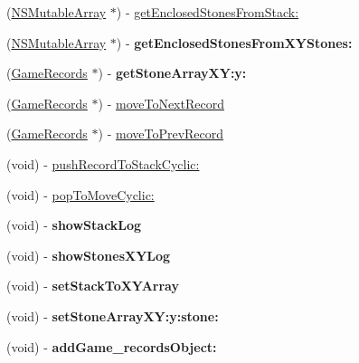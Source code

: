 \begin{DoxyCompactItemize}
\item 
(\hyperlink{class_n_s_mutable_array}{NSMutableArray} $\ast$) -\/ \hyperlink{interface_games_a3c209384d054a75c0e08a5e1107ead3f}{getEnclosedStonesFromStack:}
\item 
\hypertarget{interface_games_a6fada6f7a5e589c859d987ebfe7ef69c}{
(\hyperlink{class_n_s_mutable_array}{NSMutableArray} $\ast$) -\/ {\bfseries getEnclosedStonesFromXYStones:}}
\label{interface_games_a6fada6f7a5e589c859d987ebfe7ef69c}

\item 
\hypertarget{interface_games_aec8599f725ed45a79fea1a19a919f5dd}{
(\hyperlink{interface_game_records}{GameRecords} $\ast$) -\/ {\bfseries getStoneArrayXY:y:}}
\label{interface_games_aec8599f725ed45a79fea1a19a919f5dd}

\item 
(\hyperlink{interface_game_records}{GameRecords} $\ast$) -\/ \hyperlink{interface_games_a2bcadbacf50a9d7e7e45e1372de6ac97}{moveToNextRecord}
\item 
(\hyperlink{interface_game_records}{GameRecords} $\ast$) -\/ \hyperlink{interface_games_a620301ed77395102fdb427c8a0d060cf}{moveToPrevRecord}
\item 
(void) -\/ \hyperlink{interface_games_aad47ae4e9af60c4288ba8a0b61e604d3}{pushRecordToStackCyclic:}
\item 
(void) -\/ \hyperlink{interface_games_ac2add832bf20e19420784775a061d300}{popToMoveCyclic:}
\item 
\hypertarget{interface_games_a585c2b097394ef607f29d2a36a113c1a}{
(void) -\/ {\bfseries showStackLog}}
\label{interface_games_a585c2b097394ef607f29d2a36a113c1a}

\item 
\hypertarget{interface_games_ad6eacd14dcf954b902b66b445b1a5c6c}{
(void) -\/ {\bfseries showStonesXYLog}}
\label{interface_games_ad6eacd14dcf954b902b66b445b1a5c6c}

\item 
\hypertarget{interface_games_a18c5e32f0ce44370f981950e8f4121e4}{
(void) -\/ {\bfseries setStackToXYArray}}
\label{interface_games_a18c5e32f0ce44370f981950e8f4121e4}

\item 
\hypertarget{interface_games_a373d76bc748ebe5a181c4b69803fd72b}{
(void) -\/ {\bfseries setStoneArrayXY:y:stone:}}
\label{interface_games_a373d76bc748ebe5a181c4b69803fd72b}

\item 
\hypertarget{interface_games_a00f0d0456bde50486d6144218ec608f8}{
(void) -\/ {\bfseries addGame\_\-recordsObject:}}
\label{interface_games_a00f0d0456bde50486d6144218ec608f8}


\end{DoxyCompactItemize}
